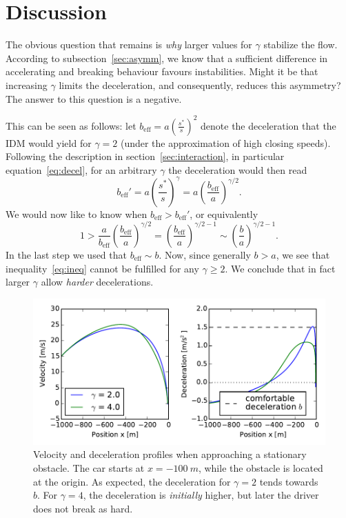 \section{Discussion}
The obvious question that remains is \emph{why} larger values for $\gamma$ stabilize the flow. According to subsection~\ref{sec:asymm}, we know that a sufficient difference in accelerating and breaking behaviour favours instabilities. Might it be that increasing $\gamma$ limits the deceleration, and consequently, reduces this asymmetry? The answer to this question is a negative. 

This can be seen as follows: let $b_\mathrm{eff} = a\left(\frac{s^*}{s}\right)^2$ denote the deceleration that the IDM would yield for $\gamma=2$ (under the approximation of high closing speeds). 
Following the description in section~\ref{sec:interaction}, in particular equation~\eqref{eq:decel}, for an arbitrary $\gamma$ the deceleration would then read
\begin{equation}
    b_\mathrm{eff}' = a\left(\frac{s^*}{s}\right)^\gamma = a \left(\frac{b_\mathrm{eff}}{a}\right)^{\gamma/2}.
\end{equation}
We would now like to know when $b_\mathrm{eff}>b_\mathrm{eff}'$, or equivalently
\begin{equation}
1>\frac{a}{b_\mathrm{eff}} \left(\frac{b_\mathrm{eff}}{a}\right)^{\gamma/2} = \left(\frac{b_\mathrm{eff}}{a}\right)^{\gamma/2-1}\sim\left(\frac{b}{a}\right)^{\gamma/2-1}.
\label{eq:ineq}
\end{equation}
In the last step we used that $b_\mathrm{eff}\sim b$. Now, since generally $b>a$, we see that inequality~\eqref{eq:ineq} cannot be fulfilled for any $\gamma\ge 2$. We conclude that in fact larger $\gamma$ allow \emph{harder} decelerations.

\begin{figure}
    \centering
    \includegraphics[width=5in]{../img/vel_profile.pdf}
    \caption{Velocity and deceleration profiles when approaching a stationary obstacle. The car starts at $x=\SI{-100}{m}$, while the obstacle is located at the origin. As expected, the deceleration for $\gamma=2$ tends towards $b$. For $\gamma=4$, the deceleration is \emph{initially} higher, but later the driver does not break as hard.}
    \label{fig:vel_profile}
\end{figure}

